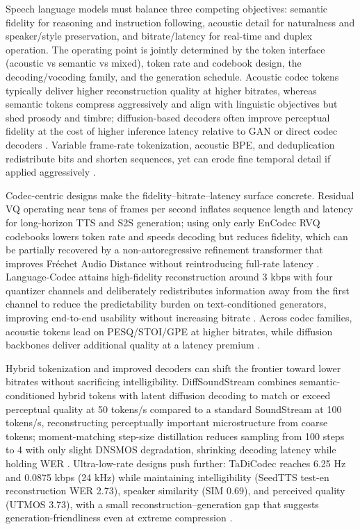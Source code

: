 \documentclass{article}
\begin{document}
Speech language models must balance three competing objectives: semantic fidelity for reasoning and instruction following, acoustic detail for naturalness and speaker/style preservation, and bitrate/latency for real-time and duplex operation. The operating point is jointly determined by the token interface (acoustic vs semantic vs mixed), token rate and codebook design, the decoding/vocoding family, and the generation schedule. Acoustic codec tokens typically deliver higher reconstruction quality at higher bitrates, whereas semantic tokens compress aggressively and align with linguistic objectives but shed prosody and timbre; diffusion-based decoders often improve perceptual fidelity at the cost of higher inference latency relative to GAN or direct codec decoders \cite{guo2025recentadvancesdiscretespeechtokensreview}. Variable frame-rate tokenization, acoustic BPE, and deduplication redistribute bits and shorten sequences, yet can erode fine temporal detail if applied aggressively \cite{guo2025recentadvancesdiscretespeechtokensreview}.



Codec-centric designs make the fidelity–bitrate–latency surface concrete. Residual VQ operating near tens of frames per second inflates sequence length and latency for long-horizon TTS and S2S generation; using only early EnCodec RVQ codebooks lowers token rate and speeds decoding but reduces fidelity, which can be partially recovered by a non-autoregressive refinement transformer that improves Fréchet Audio Distance without reintroducing full-rate latency . Language-Codec attains high-fidelity reconstruction around 3 kbps with four quantizer channels and deliberately redistributes information away from the first channel to reduce the predictability burden on text-conditioned generators, improving end-to-end usability without increasing bitrate \cite{ji2025languagecodecbridgingdiscreterepresentat}. Across codec families, acoustic tokens lead on PESQ/STOI/GPE at higher bitrates, while diffusion backbones deliver additional quality at a latency premium \cite{guo2025recentadvancesdiscretespeechtokensreview}.



Hybrid tokenization and improved decoders can shift the frontier toward lower bitrates without sacrificing intelligibility. DiffSoundStream combines semantic-conditioned hybrid tokens with latent diffusion decoding to match or exceed perceptual quality at 50 tokens/s compared to a standard SoundStream at 100 tokens/s, reconstructing perceptually important microstructure from coarse tokens; moment-matching step-size distillation reduces sampling from 100 steps to 4 with only slight DNSMOS degradation, shrinking decoding latency while holding WER \cite{yang2025diffsoundstreamefficientspeechtokenizati}. Ultra-low-rate designs push further: TaDiCodec reaches 6.25 Hz and 0.0875 kbps (24 kHz) while maintaining intelligibility (SeedTTS test-en reconstruction WER 2.73), speaker similarity (SIM 0.69), and perceived quality (UTMOS 3.73), with a small reconstruction–generation gap that suggests generation-friendliness even at extreme compression \cite{wang2025tadicodectextawarediffusionspeechtokeniz}.
\end{document}
